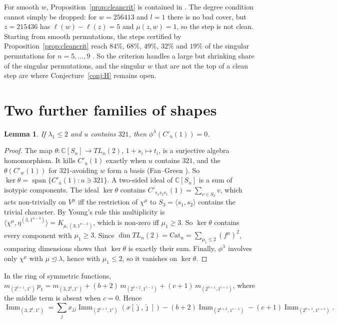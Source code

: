 \documentclass[11pt]{amsart}
\newtheorem{lemma}[theorem]{Lemma}
\theoremstyle{definition}
\theoremstyle{remark}
\newcommand{\Imm}{\operatorname{Imm}}
\newcommand{\Cp}[1]{C'_{#1}(1)}
\begin{document}
For smooth $w$, Proposition~\ref{prop:cleancrit} is contained in \cite[Prop.~3.1]{AN}. The degree condition cannot simply be dropped: for $w=256413$ and $l=1$ there is no bad cover, but $z=215436$ has $\ell(w)-\ell(z)=5$ and $\mu(z,w)=1$, so the step is not clean. Starting from smooth permutations, the steps certified by Proposition~\ref{prop:cleancrit} reach $84\%$, $68\%$, $49\%$, $32\%$ and $19\%$ of the singular permutations for $n=5,\dots,9$ \cite{McN}. So the criterion handles a large but shrinking share of the singular permutations, and the singular $w$ that are not the top of a clean step are where Conjecture~\ref{conj:H} remains open.

\section{Two further families of shapes}\label{sec:twocol}

\begin{lemma}\label{lem:fangreen}
If $\lambda_1\le2$ and $u$ contains $321$, then $\phi^\lambda(\Cp u)=0$.
\end{lemma}

\begin{proof}
The map $\theta\colon\mathbb{C}[S_n]\to TL_n(2)$, $1+s_i\mapsto t_i$, is a surjective algebra homomorphism. It kills $\Cp u$ exactly when $u$ contains $321$, and the $\theta(\Cp w)$ for $321$-avoiding $w$ form a basis (Fan--Green \cite{FG}). So $\ker\theta=\operatorname{span}\{\Cp u:u\ni321\}$. A two-sided ideal of $\mathbb{C}[S_n]$ is a sum of isotypic components. The ideal $\ker\theta$ contains $\Cp{s_1s_2s_1}=\sum_{v\in S_3}v$, which acts non-trivially on $V^\mu$ iff the restriction of $\chi^\mu$ to $S_3=\langle s_1,s_2\rangle$ contains the trivial character. By Young's rule this multiplicity is $\langle\chi^\mu,\eta^{(3,1^{n-3})}\rangle=K_{\mu,(3,1^{n-3})}$, which is non-zero iff $\mu_1\ge3$. So $\ker\theta$ contains every component with $\mu_1\ge3$. Since $\dim TL_n(2)=\mathrm{Cat}_n=\sum_{\mu_1\le2}(f^\mu)^2$, comparing dimensions shows that $\ker\theta$ is exactly their sum. Finally, $\phi^\lambda$ involves only $\chi^\mu$ with $\mu\trianglelefteq\lambda$, hence with $\mu_1\le2$, so it vanishes on $\ker\theta$.
\end{proof}

In the ring of symmetric functions, $m_{(2^{b+1},1^c)}\,p_1=m_{(3,2^b,1^c)}+(b+2)\,m_{(2^{b+2},1^{c-1})}+(c+1)\,m_{(2^{b+1},1^{c+1})}$, where the middle term is absent when $c=0$. Hence
\begin{equation}\label{eq:onethree}
\Imm_{(3,2^b,1^c)}=\sum_jx_{jj}\Imm_{(2^{b+1},1^c)}(x[\hat\jmath,\hat\jmath])
-(b+2)\Imm_{(2^{b+2},1^{c-1})}-(c+1)\Imm_{(2^{b+1},1^{c+1})}.
\end{equation}
\end{document}

